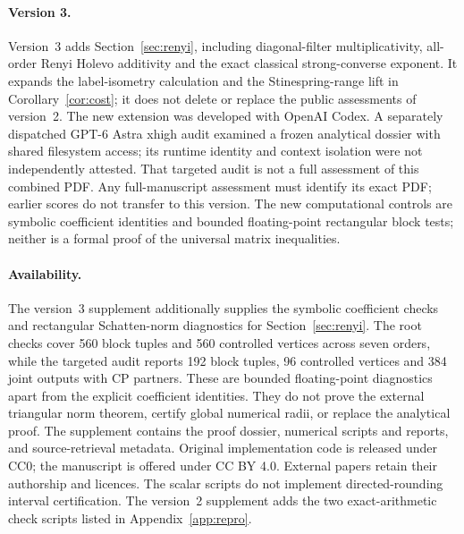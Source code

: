 \documentclass[11pt]{article}
\begin{document}
\paragraph{Version 3.}
Version~3 adds Section~\ref{sec:renyi}, including diagonal-filter
multiplicativity, all-order Renyi Holevo additivity and the exact classical
strong-converse exponent. It expands the label-isometry calculation and
the Stinespring-range lift in Corollary~\ref{cor:cost}; it does not delete
or replace the public assessments of version~2. The new extension was
developed with OpenAI Codex. A separately dispatched GPT-6 Astra xhigh
audit examined a frozen analytical dossier with shared filesystem access;
its runtime identity and context isolation were not independently attested.
That targeted audit is not a full assessment of this combined PDF.
Any full-manuscript assessment must identify its exact PDF; earlier scores do not transfer to this version.
The new computational controls are symbolic coefficient identities and
bounded floating-point rectangular block tests; neither is a formal proof
of the universal matrix inequalities.

\paragraph{Availability.}
The version~3 supplement additionally supplies the symbolic coefficient
checks and rectangular Schatten-norm diagnostics for
Section~\ref{sec:renyi}. The root checks cover 560 block tuples and 560
controlled vertices across seven orders, while the targeted audit reports
192 block tuples, 96 controlled vertices and 384 joint outputs with CP
partners. These are bounded floating-point diagnostics apart from the
explicit coefficient identities. They do not prove the external triangular
norm theorem, certify global numerical radii, or replace the analytical proof.
The supplement contains the proof dossier, numerical scripts and reports, and source-retrieval metadata. Original implementation code is released under CC0; the manuscript is offered under CC BY 4.0. External papers retain their authorship and licences. The scalar scripts do not implement directed-rounding interval certification. The version~2 supplement adds the two exact-arithmetic check scripts listed in Appendix~\ref{app:repro}.


\appendix
\end{document}
